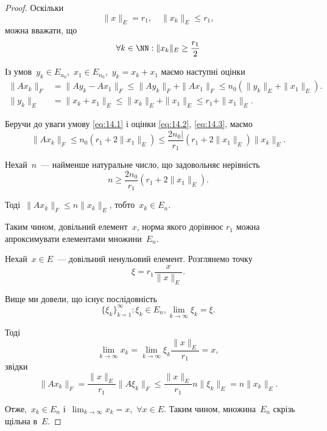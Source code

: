 \begin{proof}
Оскільки
\begin{equation*}
    \|x\|_E = r_1, \quad \|x_k\|_E \le r_1,
\end{equation*}
можна вважати, що
\begin{equation}
    \label{eq:14.1}
    \forall k \in \NN: \|x_k\|_E \ge \frac{r_1}{2}
\end{equation}

Із умов~$y_k \in E_{n_0}$,~$x_1 \in E_{n_0}$,~$y_k = x_k + x_1$
маємо наступні оцінки
\begin{align}
    \label{eq:14.2}
    \|Ax_k\|_F &= \|A y_k - A x_1\|_F \le \|A y_k\|_F + \|A x_1\|_F \le n_0 (\|y_k\|_E + \|x_1\|_E). \\
    \label{eq:14.3}
    \|y_k\|_E &= \|x_k + x_1\|_E \le \|x_k\|_E + \|x_1\|_E \le r_1 + \|x_1\|_E.
\end{align}

Беручи до уваги умову \eqref{eq:14.1} і оцінки \eqref{eq:14.2}, \eqref{eq:14.3}, маємо
\begin{equation*}
    \|A x_k\|_F \le
    n_0 (r_1 + 2 \|x_1\|_E) \le
    \frac{2 n_0|}{r_1} (r_1 + 2 \|x_1\|_E) \|x_k\|_E.
\end{equation*}

Нехай~$n$~--- найменше натуральне число, що задовольняє нерівність
\begin{equation*}
    n \ge \frac{2 n_0}{r_1} (r_1 + 2 \|x_1\|_E).
\end{equation*}

Тоді~$\|Ax_k\|_F \le n \|x_k\|_E$, тобто~$x_k \in E_n$.

Таким чином, довільний елемент~$x$, норма якого дорівнює
$r_1$ можна апроксимувати елементами множини~$E_n$.

Нехай~$x \in E$~--- довільний ненульовий елемент.
Розглянемо точку 
\begin{equation*}
    \xi = r_1 \frac{x}{\|x\|_E}.
\end{equation*}

Вище ми довели, що існує послідовність
\begin{equation*}
    \{\xi_k\}_{k = 1}^\infty: \xi_k \in E_n, \lim_{k \to \infty} \xi_k = \xi.
\end{equation*}

Тоді
\begin{equation*}
    \lim_{k \to \infty} x_k = \lim_{k \to \infty} \xi_k \frac{\|x\|_E}{r_1} = x,
\end{equation*}
звідки
\begin{equation*}
    \|Ax_k\|_F = \frac{\|x\|_E}{r_1} \|A\xi_k\|_F \le \frac{\|x\|_E}{r_1} n \|\xi_k\|_E = n \|x_k\|_E.
\end{equation*}

Отже,~$x_k \in E_n$ і~$\lim_{k \to \infty} x_k = x$,~$\forall x \in E$.
Таким чином, множина~$E_n$ скрізь щільна в~$E$.
\end{proof}

